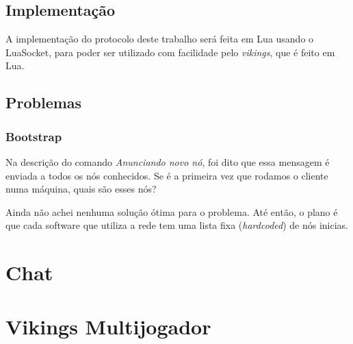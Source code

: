   \subsection{Implementação}
    A implementação do protocolo deste trabalho será feita em Lua usando o LuaSocket, %
    para poder ser utilizado com facilidade pelo \textit{vikings}, que é feito em Lua.
  
  \subsection{Problemas}
    \subsubsection{Bootstrap}
      Na descrição do comando \textit{Anunciando novo nó}, foi dito que essa mensagem é enviada a todos
      os nós conhecidos. Se é a primeira vez que rodamos o cliente numa máquina, quais são esses nós?
      
      Ainda não achei nenhuma solução ótima para o problema. Até então, o plano é que cada software
      que utiliza a rede tem uma lista fixa (\textit{hardcoded}) de nós inicias.
\section{Chat}
\label{sec:resultados:chat}

\section{Vikings Multijogador}
\label{sec:resultados:vikings}
